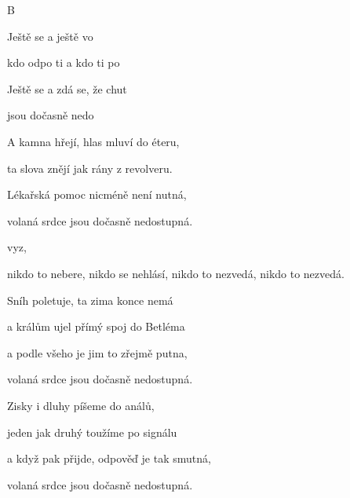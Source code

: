 B



\zs
Ještě se  a ještě  vo

kdo odpo ti a kdo ti  po

Ještě se  a zdá se, že  chut

  jsou dočasně nedo
\ks

\zs
A kamna hřejí, hlas mluví do éteru,

ta slova znějí jak rány z revolveru.

Lékařská pomoc nicméně není nutná,

volaná srdce jsou dočasně nedostupná.
\ks

\zr
{}   vyz,       

nikdo to nebere,
nikdo se nehlásí,
nikdo to nezvedá,
nikdo to nezvedá.
\kr

\zs
Sníh poletuje, ta zima konce nemá

a králům ujel přímý spoj do Betléma

a podle všeho je jim to zřejmě putna,

volaná srdce jsou dočasně nedostupná.
\ks

\zr \kr

\zs
Zisky i dluhy píšeme do análů,

jeden jak druhý toužíme po signálu

a když pak přijde, odpověď je tak smutná,

volaná srdce jsou dočasně nedostupná.
\ks

\zr \kr


\kp







